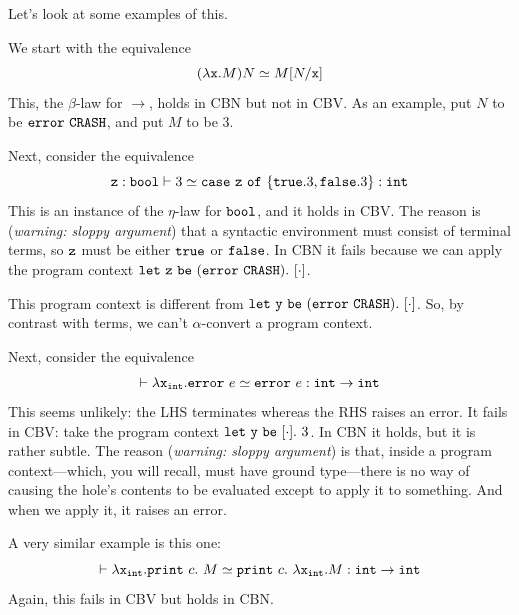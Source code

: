 \documentclass[runningheads,12pt]{llncs}
\newcommand{\ttletmac}[2]{\mathtt{let}\ {#2}\ \mathtt{be}\ {#1}.\ }
\begin{document}
Let's look at some examples of this.  %

We start with the equivalence
\begin{displaymath}
  (\lambda \mathtt{x}. M) N \simeq M[N/\mathtt{x}]
\end{displaymath}
This, the $\beta$-law for $\rightarrow$, holds in CBN but not in CBV.  As an example, put $N$ to be $\mathtt{error}\  \mathtt{CRASH}$, and put $M$ to be 3.  

Next, consider the equivalence
\begin{displaymath}
 \mathtt{z}:\mathtt{bool} \vdash 3 \simeq \mathtt{case} \  \mathtt{z} \ \mathtt{of}\  \{ \mathtt{true}. 3, \mathtt{false}. 3 \}  : \mathtt{int}
\end{displaymath}
This is an instance of the $\eta$-law for $\mathtt{bool}$, and it holds in CBV.  The reason is (\emph{warning: sloppy argument}) that a syntactic environment must consist of terminal terms, so $\mathtt{z}$ must be either $\mathtt{true}$ or $\mathtt{false}$.  In CBN it fails because we can apply the program context $\ttletmac{ (\tterror \mathtt{CRASH}) }{ \ttz } [\cdot]$.

\begin{remark}
This program context is different from  $\ttletmac{ (\tterror \mathtt{CRASH}) }{ \tty } [\cdot]$.   So, by contrast with terms, we can't $\alpha$-convert a program context.  
\end{remark}

Next, consider the equivalence
\begin{displaymath}
 \vdash  \lambda \mathtt{x}_{\mathtt{int}}. \mathtt{error}\  e \simeq \mathtt{error}\  e : \mathtt{int} \rightarrow \mathtt{int}
\end{displaymath}
This seems unlikely: the LHS terminates whereas the RHS raises an error.  It fails in CBV: take the program context $\ttletmac{ [\cdot] }{ \tty } 3$.  In CBN it holds, but it is rather subtle.  The reason (\emph{warning: sloppy argument}) is that, inside a program context---which, you will recall, must have ground type---there is no way of causing the hole's contents to be evaluated except to apply it to something.  And when we apply it, it raises an error.  

A very similar example is this one:
\begin{displaymath}
  \vdash \lambda \mathtt{x}_{\mathtt{int}}. \mathtt{print}\  {c}.\ {M} \simeq \mathtt{print}\  {c}.\ {\lambda \mathtt{x}_{\mathtt{int}}. M} : \mathtt{int} \rightarrow \mathtt{int}
\end{displaymath}
Again, this fails in CBV but holds in CBN.
\end{document}
